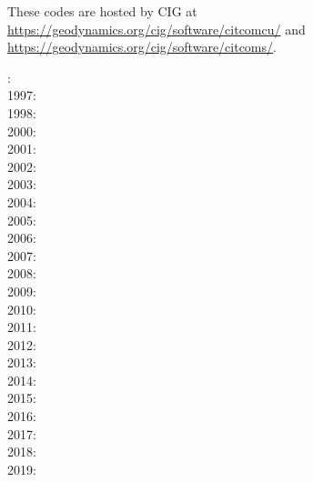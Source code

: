 \begin{itemize}
These codes are hosted by CIG at \url{https://geodynamics.org/cig/software/citcomcu/}
and \url{https://geodynamics.org/cig/software/citcoms/}.

: \cite{somo96}\\
1997: \cite{mole97}\\
1998: \cite{moso98}\cite{zhgm98}\cite{vazh99}\\
2000: \cite{zhzm00}\cite{gumr00}\\
2001: \cite{bigu01}\\
2002: \cite{tagh02}\\
2003: \cite{vazh03}\cite{cogu03}\cite{bigu03}\\
2004: \cite{solo04}\\
2005: \cite{bihi05}\\
2006: \cite{beck06}\cite{pibf06}\cite{tact06}\cite{besb06}\cite{coli06}\\
2007: \cite{bihi07}\cite{zhzl07}\cite{magu07}\cite{bavi07}\cite{rimb07}\cite{mofm07}\cite{cobs07}\\
2008: \cite{dihf08}\cite{gamc08}\cite{zhmt08}\cite{hole08}\\
2009: \cite{lizh09}\cite{arhm09}\cite{zhzm09}\cite{anbi09}\cite{fobe09}\cite{bubi09}\cite{befa09}\cite{lezh09}\\
2010: \cite{bumb10}\cite{vabv10}\cite{baiv10}\cite{bubi10}\cite{zhzl10}\cite{bill10}\cite{jabi10}\\
2011: \cite{befa11}\cite{lemj11}\cite{vaal11}\cite{legu11}\cite{list11}\\
2012: \cite{arbi12}\cite{jabi12}\cite{bija12}\cite{bova12}\cite{hucf12}\cite{zhym12}\cite{solo12}
\cite{hibi12}\cite{jabk12}\cite{mapm12}\\
2013: \cite{bacs13}\cite{bogs13a}\cite{bogs13b}\cite{jabr13}\cite{qula13}\cite{oldh13}\cite{arbi13}\cite{cost13}\\
2014: \cite{flgw14}\cite{budt14}\cite{kava14}\cite{arfw14}\cite{wavp14}\cite{seki14}\cite{agvg14}
\cite{mabv14}\cite{zhu14}\\
2015: \cite{bacs15}\cite{bogf15}\cite{bomv15}\cite{sefw15}\cite{daso15}\cite{vami15}\cite{wazh15}
\cite{wavp15}\cite{waav15}\cite{hafg15}\cite{tarn15}\cite{legu15}\\
2016: \cite{welm16}\cite{wele16}\cite{jada16}\cite{frbs16}\\
2017: \cite{aggv17}\cite{maav17}\cite{frbm17}\cite{haja17}\\
2018: \cite{hect18}\cite{king18}\cite{kavb18}\\
2019: \cite{mavb19}\cite{fube19}\cite{magn19}\cite{malg19}\cite{mazh19}



\end{itemize}
